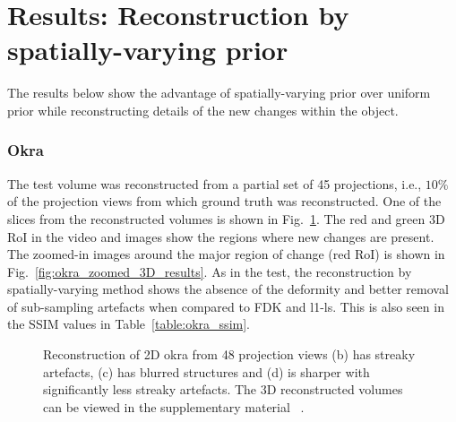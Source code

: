 \documentclass[journal]{IEEEtran}
\begin{document}
\section{Results: Reconstruction by spatially-varying prior}
\label{sec:results_spatially_varying_prior}

The results below show the advantage of spatially-varying prior over uniform prior while reconstructing details of the new changes within the object.

\subsubsection{\textbf{Okra}}
\label{Sec:okra_spatially_varying}
The test volume was reconstructed from a partial set of
45 projections, i.e., $10\%$ of the projection views from which ground
truth was reconstructed. One of the slices from the reconstructed volumes 
is shown in Fig.~\ref{fig:okra_3D_results}. The red and green 3D
RoI in the video and images show the regions where new changes are
present. The zoomed-in images around the major region of change (red
RoI) is shown in Fig.~\ref{fig:okra_zoomed_3D_results}. As in the
test, the reconstruction by spatially-varying method shows the absence
of the deformity and better removal of sub-sampling artefacts when
compared to FDK and l1-ls. This is also seen in the SSIM values in
Table~\ref{table:okra_ssim}.


\begin{figure}[!h]
\centering
{}
{}
\caption{Reconstruction of 2D okra from 48 projection views
   (b) has streaky artefacts, (c) has blurred structures and (d) is sharper with significantly less streaky artefacts. The 3D reconstructed volumes can be viewed  in the supplementary material ~\cite{supp_paper}.}
\label{fig:okra_3D_results}
\end{figure}
\end{document}
